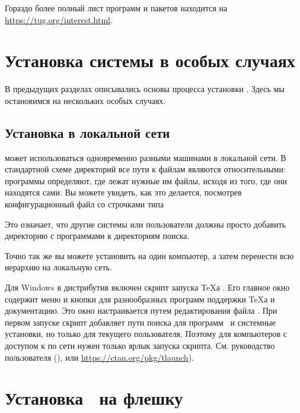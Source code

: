 \documentclass{article}
\begin{document}
Гораздо более полный лист программ и пакетов находится на
\url{https://tug.org/interest.html}. 

\section{Установка системы в особых случаях}

В предыдущих разделах описывались основы процесса установки \TL.
Здесь мы остановимся на нескольких особых случаях.

\subsection{Установка в локальной сети}
\label{sec:sharedinstall}

\TL{} может использоваться одновременно разными машинами в локальной
сети.  В стандартной схеме директорий все пути к файлам являются
относительными: программы \TL{} определяют, где лежат нужные им файлы,
исходя из того, где они находятся сами.  Вы можете увидеть, как это
делается, посмотрев конфигурационный файл
 со строчками типа
Это означает, что другие системы или пользователи должны просто
добавить директорию с программами \TL{} к директориям поиска.

Точно так же вы можете установить \TL{} на один компьютер, а затем
перенести всю иерархию на локальную сеть.

Для Windows в дистрибутив включен скрипт запуска \TeX а
.  Его главное окно содержит меню и кнопки для
разнообразных программ поддержки \TeX а и документацию.  Это окно
настраивается путем редактирования файла .  При первом
запуске скрипт добавляет пути поиска для программ \TL\ и системные
установки, но только для текущего пользователя, Поэтому для
компьютеров с доступом к \TL{} по сети нужен только ярлык запуска
скрипта.  См. руководство пользователя  (), или \url{https://ctan.org/pkg/tlaunch}).



\section{Установка \TL\ на флешку}
\label{sec:portable-tl}
\end{document}
